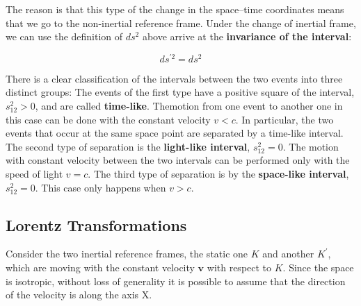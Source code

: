  The reason is that this type of the change in the space–time coordinates means that we go to the non-inertial reference frame. Under the change of inertial frame, we can use the definition of $ds^2$ above arrive at the \textbf{invariance of the interval}:
\begin{qt}
    \begin{equation}
d s^{\prime 2}=d s^{2}
\label{ds-invariance}
\end{equation}
\end{qt}
There is a clear classification of the intervals between the two events into three distinct groups: The events of the first type have a positive square of the interval, $s^2_{12}>0$, and are called \textbf{time-like}. Themotion from one event to another one in this case can be done with the constant velocity $v<c$. In particular, the two events that occur at the same space point are separated by a time-like interval. The second type of separation is the \textbf{light-like interval}, $s^2_{12}=0$. The motion with constant velocity between the two intervals can be performed only with the speed of light $v=c$. The third type of separation is by the \textbf{space-like interval}, $s^2_{12}=0$. This case only happens when $v>c$.
\subsection{Lorentz Transformations}
Consider the two inertial reference frames, the static one $K$ and another $K^{\prime}$, which are moving with the constant velocity $\mathbf{v}$ with respect to $K$. Since the space is isotropic, without loss of generality it is possible to assume that the direction of the velocity is along the axis X.

